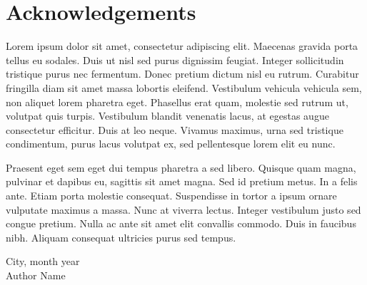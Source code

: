 \chapter*{Acknowledgements}


Lorem ipsum dolor sit amet, consectetur adipiscing elit. Maecenas gravida porta
tellus eu sodales. Duis ut nisl sed purus dignissim feugiat. Integer
sollicitudin tristique purus nec fermentum. Donec pretium dictum nisl eu rutrum.
Curabitur fringilla diam sit amet massa lobortis eleifend. Vestibulum vehicula
vehicula sem, non aliquet lorem pharetra eget. Phasellus erat quam, molestie sed
rutrum ut, volutpat quis turpis. Vestibulum blandit venenatis lacus, at egestas
augue consectetur efficitur. Duis at leo neque. Vivamus maximus, urna sed
tristique condimentum, purus lacus volutpat ex, sed pellentesque lorem elit eu
nunc.

Praesent eget sem eget dui tempus pharetra a sed libero. Quisque quam magna,
pulvinar et dapibus eu, sagittis sit amet magna. Sed id pretium metus. In a
felis ante. Etiam porta molestie consequat. Suspendisse in tortor a ipsum ornare
vulputate maximus a massa. Nunc at viverra lectus. Integer vestibulum justo sed
congue pretium. Nulla ac ante sit amet elit convallis commodo. Duis in faucibus
nibh. Aliquam consequat ultricies purus sed tempus.

\vspace{1cm}
\nobreak
\begin{flushleft}
\hfill City, month year \\ 
\hfill Author Name \\
\end{flushleft}